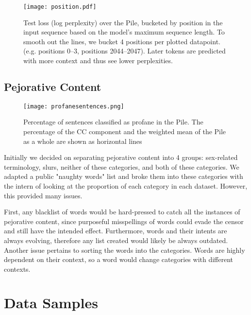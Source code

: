 \documentclass[11pt,a4paper]{article}
\begin{document}
\begin{appendices}
\begin{figure}[ht]
  \texttt{[image: position.pdf]}
  \caption{Test loss (log perplexity) over the Pile, bucketed by position in the input sequence based on the model's maximum sequence length. To smooth out the lines, we bucket 4 positions per plotted datapoint. (e.g. positions 0--3, positions 2044--2047). Later tokens are predicted with more context and thus see lower perplexities.} 
   \label{fig:position_perplexity}
\end{figure}

\subsection{Pejorative Content}\label{apdx:own_pejorative}

\begin{figure}[ht]
  \texttt{[image: profanesentences.png]}
  \caption{Percentage of sentences classified as profane in the Pile. The percentage of the CC component and the weighted mean of the Pile as a whole are shown as horizontal lines} 
   \label{fig:profane_sent}%
\end{figure}

Initially we decided on separating pejorative content into 4 groups: sex-related terminology, slurs, neither of these categories, and both of these categories. We adapted a public "naughty words" list and broke them into these categories with the intern of looking at the proportion of each category in each dataset. However, this provided many issues. 

First, any blacklist of words would be hard-pressed to catch all the instances of pejorative content, since purposeful misspellings of words could evade the censor and still have the intended effect. Furthermore, words and their intents are always evolving, therefore any list created would likely be always outdated. %
Another issue pertains to sorting the words into the categories. Words are highly dependent on their context, so a word would change categories with different contexts.



\section{Data Samples}


\end{appendices}
\end{document}
